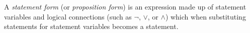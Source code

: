 \guard







\begin{defn}
\label{defn:statementForm}
  A \emph{statement form} (or \emph{proposition form}) is an expression made up of statement variables and logical connections (such as $\neg$, $\vee$, or $\wedge$) which when substituting statements for statement variables becomes a statement.
\end{defn}
